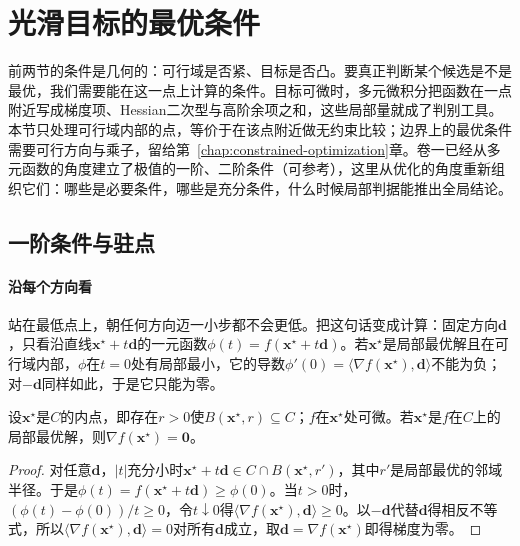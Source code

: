 \section{光滑目标的最优条件}
\label{sec:opt-prob-optimality}

前两节的条件是几何的：可行域是否紧、目标是否凸。要真正判断某个候选是不是最优，我们需要能在这一点上计算的条件。目标可微时，多元微积分把函数在一点附近写成梯度项、Hessian二次型与高阶余项之和，这些局部量就成了判别工具。本节只处理可行域内部的点，等价于在该点附近做无约束比较；边界上的最优条件需要可行方向与乘子，留给第~\ref{chap:constrained-optimization}章。卷一已经从多元函数的角度建立了极值的一阶、二阶条件（可参考），这里从优化的角度重新组织它们：哪些是必要条件，哪些是充分条件，什么时候局部判据能推出全局结论。

\subsection{一阶条件与驻点}
\label{sec:opt-prob-first-order}

\paragraph{沿每个方向看}
站在最低点上，朝任何方向迈一小步都不会更低。把这句话变成计算：固定方向$\bm d$，只看沿直线$\bm x^\star+t\bm d$的一元函数$\phi(t)=f(\bm x^\star+t\bm d)$。若$\bm x^\star$是局部最优解且在可行域内部，$\phi$在$t=0$处有局部最小，它的导数$\phi'(0)=\langle\nabla f(\bm x^\star),\bm d\rangle$不能为负；对$-\bm d$同样如此，于是它只能为零。

\begin{theorem}[一阶必要条件]
\label{thm:opt-prob-first-order-necessary}
设$\bm x^\star$是$C$的内点，即存在$r>0$使$B(\bm x^\star,r)\subseteq C$；$f$在$\bm x^\star$处可微。若$\bm x^\star$是$f$在$C$上的局部最优解，则$\nabla f(\bm x^\star)=\bm 0$。
\end{theorem}

\begin{proof}
对任意$\bm d$，$|t|$充分小时$\bm x^\star+t\bm d\in C\cap B(\bm x^\star,r')$，其中$r'$是局部最优的邻域半径。于是$\phi(t)=f(\bm x^\star+t\bm d)\geq\phi(0)$。当$t>0$时，$(\phi(t)-\phi(0))/t\geq0$，令$t\downarrow0$得$\langle\nabla f(\bm x^\star),\bm d\rangle\geq0$。以$-\bm d$代替$\bm d$得相反不等式，所以$\langle\nabla f(\bm x^\star),\bm d\rangle=0$对所有$\bm d$成立，取$\bm d=\nabla f(\bm x^\star)$即得梯度为零。
\end{proof}


